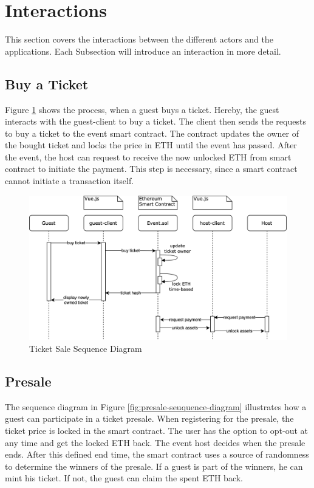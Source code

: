 \section{Interactions}
This section covers the interactions between the different actors and the applications. Each Subsection will introduce an interaction in more detail.

\subsection{Buy a Ticket}
Figure \ref{fig:buyticket-sequence-diagram} shows the process, when a guest buys a ticket. Hereby, the guest interacts with the guest-client to buy a ticket. The client then sends the requests to buy a ticket to the event smart contract. The contract updates the owner of the bought ticket and locks the price in ETH until the event has passed. After the event, the host can request to receive the now unlocked ETH from smart contract to initiate the payment. This step is necessary, since a smart contract cannot initiate a transaction itself.
\begin{figure}[H]
    \centering
    \includegraphics[width=16cm]{design/diagrams/BuyTicket.png}
    \caption{Ticket Sale Sequence Diagram}
    \label{fig:buyticket-sequence-diagram}
\end{figure}

\subsection{Presale}
The sequence diagram in Figure \ref{fig:presale-seuquence-diagram} illustrates how a guest can participate in a ticket presale. When registering for the presale, the ticket price is locked in the smart contract. The user has the option to opt-out at any time and get the locked ETH back. The event host decides when the presale ends. After this defined end time, the smart contract uses a source of randomness to determine the winners of the presale. If a guest is part of the winners, he can mint his ticket. If not, the guest can claim the spent ETH back.

